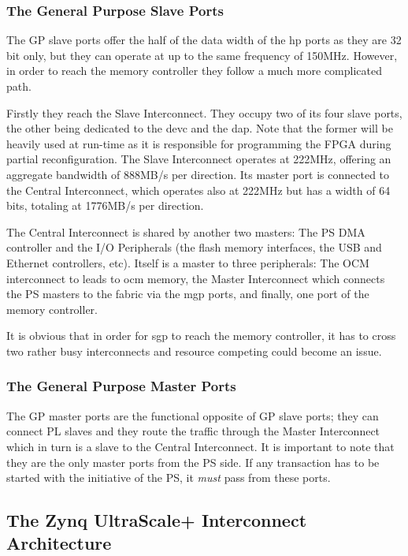 \subsubsection{The General Purpose Slave Ports}
\label{sect:sgp}

The GP slave ports offer the half of the data width 
of the \gls{hp} ports as they are 32 bit only,
but they can operate at up to the same frequency of 150MHz. 
However, in order to reach the memory controller 
they follow a much more complicated path.

Firstly they reach the Slave Interconnect. 
They occupy two of its four slave ports,
the other being dedicated to the 
\gls{devc} and the \gls{dap}.
Note that the former will be heavily used at run-time as it is responsible
for programming the FPGA during partial reconfiguration.
The Slave Interconnect operates at 222MHz, 
offering an aggregate bandwidth of 888MB/s per direction.
Its master port is connected to the Central Interconnect, 
which operates also at 222MHz but has a width of 64 bits, 
totaling at 1776MB/s per direction.

The Central Interconnect is shared by another two masters:
The PS DMA controller and the I/O Peripherals
(the flash memory interfaces, the USB and Ethernet controllers, etc).
Itself is a master to three peripherals:
The OCM interconnect to leads to \gls{ocm} memory, the Master Interconnect
which connects the PS masters to the \gls{fabric} via the \gls{mgp} ports,
and finally, one port of the memory controller.

It is obvious that in order for \gls{sgp} to reach the memory controller,
it has to cross two rather busy interconnects and resource competing
could become an issue.

\subsubsection{The General Purpose Master Ports}

The GP master ports are the functional opposite of GP slave ports;
they can connect PL slaves and they route the traffic through the
Master Interconnect which in turn is a slave to the Central Interconnect.
It is important to note that they are the only master ports from the PS side.
If any transaction has to be started with the initiative of the PS,
it \emph{must} pass from these ports.

\subsection{The Zynq UltraScale+ Interconnect Architecture}

